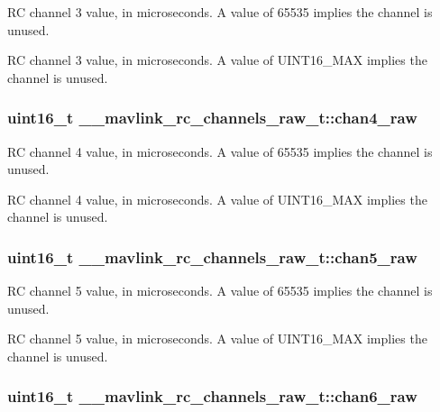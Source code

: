 R\+C channel 3 value, in microseconds. A value of 65535 implies the channel is unused. 

R\+C channel 3 value, in microseconds. A value of U\+I\+N\+T16\+\_\+\+M\+A\+X implies the channel is unused. \hypertarget{struct____mavlink__rc__channels__raw__t_a5c7b02424976def78bae64edb08b4c60}{
\subsubsection[{chan4\+\_\+raw}]{\setlength{\rightskip}{0pt plus 5cm}uint16\+\_\+t \+\_\+\+\_\+mavlink\+\_\+rc\+\_\+channels\+\_\+raw\+\_\+t\+::chan4\+\_\+raw}}\label{struct____mavlink__rc__channels__raw__t_a5c7b02424976def78bae64edb08b4c60}


R\+C channel 4 value, in microseconds. A value of 65535 implies the channel is unused. 

R\+C channel 4 value, in microseconds. A value of U\+I\+N\+T16\+\_\+\+M\+A\+X implies the channel is unused. \hypertarget{struct____mavlink__rc__channels__raw__t_add8ae2761f8b65c92d0d2cc4f2e836fd}{
\subsubsection[{chan5\+\_\+raw}]{\setlength{\rightskip}{0pt plus 5cm}uint16\+\_\+t \+\_\+\+\_\+mavlink\+\_\+rc\+\_\+channels\+\_\+raw\+\_\+t\+::chan5\+\_\+raw}}\label{struct____mavlink__rc__channels__raw__t_add8ae2761f8b65c92d0d2cc4f2e836fd}


R\+C channel 5 value, in microseconds. A value of 65535 implies the channel is unused. 

R\+C channel 5 value, in microseconds. A value of U\+I\+N\+T16\+\_\+\+M\+A\+X implies the channel is unused. \hypertarget{struct____mavlink__rc__channels__raw__t_a4f2114cbf6637d9b0c661f08d54c9958}{
\subsubsection[{chan6\+\_\+raw}]{\setlength{\rightskip}{0pt plus 5cm}uint16\+\_\+t \+\_\+\+\_\+mavlink\+\_\+rc\+\_\+channels\+\_\+raw\+\_\+t\+::chan6\+\_\+raw}}\label{struct____mavlink__rc__channels__raw__t_a4f2114cbf6637d9b0c661f08d54c9958}


